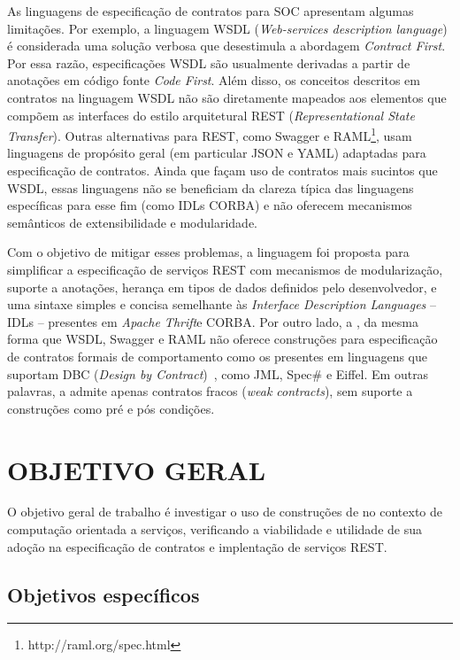 As linguagens de especificação de contratos para SOC apresentam
algumas limitações. Por exemplo, a linguagem WSDL (\emph{Web-services
description language}) \cite{zur2005developing} é considerada uma solução
verbosa que desestimula a abordagem \textit{Contract First}. Por essa razão,
especificações WSDL são usualmente derivadas a partir de anotações em código
fonte \textit{Code First}.
Além disso, os conceitos descritos em contratos na linguagem WSDL não são
diretamente mapeados aos elementos que compõem as interfaces do estilo
arquitetural REST (\emph{Representational State Transfer}).
Outras alternativas para REST, como Swagger e
RAML\footnote{http://raml.org/spec.html}, usam linguagens de propósito geral (em
particular JSON e YAML) adaptadas para especificação de contratos. Ainda que
façam uso de contratos mais sucintos que WSDL, essas linguagens não se
beneficiam da clareza típica das linguagens específicas para esse fim (como IDLs CORBA) e não oferecem
mecanismos semânticos de extensibilidade e modularidade.

Com o objetivo de mitigar esses problemas, a linguagem \neoidl{} foi proposta
para simplificar a especificação de serviços REST com mecanismos de modularização,
suporte a anotações, herança em tipos de dados definidos pelo desenvolvedor, e
uma sintaxe simples e concisa semelhante às \textit{Interface Description
Languages} -- IDLs -- presentes em \textit{Apache Thrift}\texttrademark e
CORBA\texttrademark. Por outro lado, a \neoidl{}, da mesma forma que WSDL,
Swagger e RAML não oferece construções para especificação de contratos formais de
comportamento como os presentes em linguagens que suportam DBC (\emph{Design by
Contract})~\cite{meyer1992applying}, como JML, Spec\# e Eiffel. Em outras
palavras, a \neoidl{}  admite apenas contratos fracos (\textit{weak contracts}),
sem suporte a construções como pré e pós condições.



\section{OBJETIVO GERAL}
\vspace{-6mm}

O objetivo geral de trabalho é investigar o uso de construções de
\designbycontract{} no contexto de computação orientada a serviços, verificando a
viabilidade e utilidade de sua adoção na especificação de contratos e
implentação de serviços REST.

\subsection{Objetivos específicos}
\vspace{-6mm}

